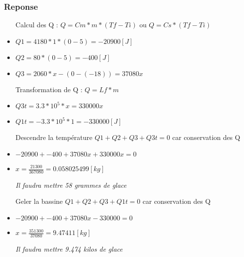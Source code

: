 \subsubsection{Reponse}
\begin{itemize}
    \item[Calcul des Q] : $Q = Cm * m * (Tf - Ti)$ ou $Q = Cs * (Tf-Ti)$ 
    \item $Q1 = 4180 * 1 * (0-5) = -20900[J]$
    \item $Q2 = 80 * (0-5) = -400[J]$
    \item $Q3 = 2060 * x - (0-(-18)) = 37080x$
    
    \item[Transformation de Q] : $Q = Lf * m$
    \item $Q3t = 3.3*10^5 * x = 330000x$
    \item $Q1t = -3.3*10^5 * 1 = -330000[J]$
    
    \item[Descendre la température] $Q1+Q2+Q3+Q3t = 0$ car conservation des Q
    \item $-20900 + -400 + 37080x + 330000x = 0$
    \item $x = \frac{21300}{367080} = 0.058025499 [kg]$
    \item[\textit{Il faudra mettre 58 grammes de glace}]
    
    \item[Geler la bassine] $Q1+Q2+Q3+Q1t = 0$ car conservation des Q
    \item $-20900 + -400 + 37080x - 330000 = 0$
    \item $x = \frac{351300}{37080} = 9.47411 [kg]$
    \item[\textit{Il faudra mettre 9.474 kilos de glace}]  

\end{itemize}